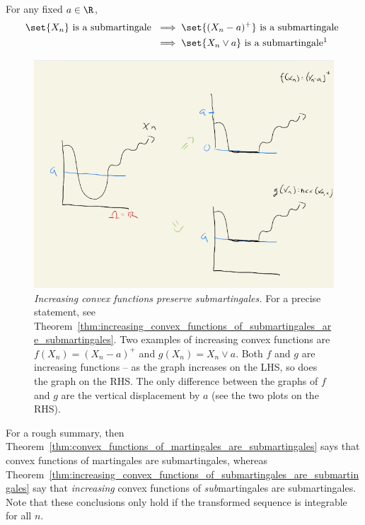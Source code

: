 \documentclass{article} %
\begin{document}
\begin{corollary}
For any fixed $a \in \R$, 
\begin{align*}
\set{X_n} \text{ is a submartingale }  &\implies   \set{(X_n-a)^+}  \text{ is a submartingale }	\\
&\implies   \set{ X_n \vee a}  \text{ is a submartingale\footnotemark }	\\
\end{align*}
\label{cor:preservation_of_submartingale_under_maximum_with_constant_and_under_taking_the_positive_part_after_subtracting_a_constant}
\end{corollary}


\begin{figure}[H]
\centering
\includegraphics[width=.5\textwidth]{images/when_convex_functions_of_random_variables_are_submartingales.png}	
\caption{\textit{Increasing convex functions preserve submartingales.} For a precise statement, see Theorem~\ref{thm:increasing_convex_functions_of_submartingales_are_submartingales}.  Two examples of increasing convex functions are $f(X_n) = (X_n-a)^+$ and $g(X_n) = X_n \vee a$. Both $f$ and $g$ are increasing functions -- as the graph increases on the LHS, so does the graph on the RHS.  The only difference between the graphs of $f$ and $g$ are the vertical displacement by $a$ (see the two plots on the RHS). }
\end{figure}


\begin{remark}
For a rough summary, then  Theorem~\ref{thm:convex_functions_of_martingales_are_submartingales} says that convex functions of martingales are submartingales, whereas Theorem~\ref{thm:increasing_convex_functions_of_submartingales_are_submartingales} say that \textit{increasing} convex functions of \textit{sub}martingales are submartingales.	 Note that these conclusions only hold if the transformed sequence is integrable for all $n$.
\end{remark}
\end{document}
